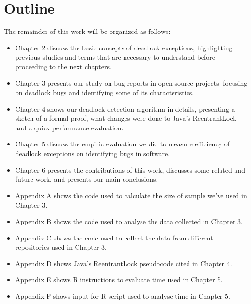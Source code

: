\section{Outline}

The remainder of this work will be organized as follows:

\begin{itemize}
  \item Chapter 2 discuss the basic concepts of deadlock exceptions, highlighting previous studies and terms that are necessary to understand before proceeding to the next chapters.
  \item Chapter 3 presents our study on bug reports in open source projects, focusing on deadlock bugs and identifying some of its characteristics.
  \item Chapter 4 shows our deadlock detection algorithm in details, presenting a sketch of a formal proof, what changes were done to Java's ReentrantLock and a quick performance evaluation.
  \item Chapter 5 discuss the empiric evaluation we did to measure efficiency of deadlock exceptions on identifying bugs in software.
  \item Chapter 6 presents the contributions of this work, discusses some related and future work, and presents our main conclusions.
  \item Appendix A shows the code used to calculate the size of sample we've used in Chapter 3.
  \item Appendix B shows the code used to analyse the data collected in Chapter 3.
  \item Appendix C shows the code used to collect the data from different repositories used in Chapter 3.
  \item Appendix D shows Java's ReentrantLock pseudocode cited in Chapter 4.
  \item Appendix E shows R instructions to evaluate time used in Chapter 5.
  \item Appendix F shows input for R script used to analyse time in Chapter 5.
\end{itemize}



